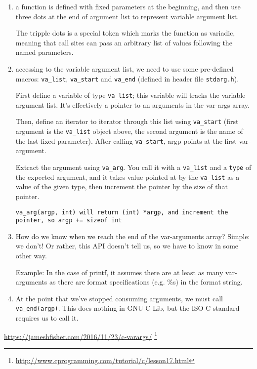 \begin{enumerate}
  
  \item a function is defined with fixed parameters at the beginning, and then use three dots at the end of argument list 
  to represent variable argument list.
  
   The tripple dots is a special token which marks the function as variadic,
   meaning that call sites can pass an arbitrary list of values following the
   named parameters.
   
  \item accessing to the variable argument list, we need to use some pre-defined macros:
\verb!va_list!, \verb!va_start! and \verb!va_end! (defined in header file \verb!stdarg.h!).
  
  First define a variable of type \verb!va_list!; this variable will tracks the variable argument list.
  It’s effectively a pointer to an arguments in the var-args array.
  
  Then, define an iterator to iterator through this list using \verb!va_start!
  (first argument is the \verb!va_list! object above, the second argument is the name of the last
  fixed parameter).
  After calling \verb!va_start!, argp points at the first var-argument.
  
  Extract the argument using \verb!va_arg!. You call it with a \verb!va_list!
  and a \verb!type! of the expected argument, and it takes value pointed at by
  the \verb!va_list! as a value of the given type, then increment the pointer by the
  size of that pointer.
\begin{verbatim}
va_arg(argp, int) will return (int) *argp, and increment the pointer, so argp += sizeof int
\end{verbatim}


  \item How do we know when we reach the end of the var-arguments array? Simple:
  we don’t! Or rather, this API doesn’t tell us, so we have to know in some
  other way.
  
  Example: In the case of printf, it assumes there are at least as many
  var-arguments as there are format specifications (e.g. \%s) in the format
  string.
  
  \item At the point that we’ve stopped consuming arguments, we must call
  \verb!va_end(argp)!. This does nothing in GNU C Lib, but the ISO C standard requires
  us to call it.
  
\end{enumerate}
\url{https://jameshfisher.com/2016/11/23/c-varargs/}
\footnote{\url{http://www.cprogramming.com/tutorial/c/lesson17.html}} 

